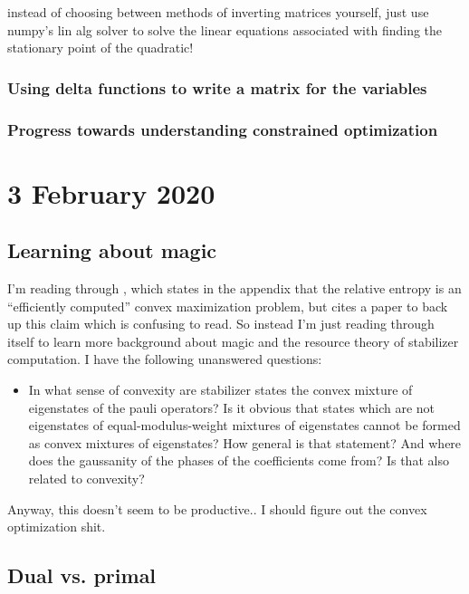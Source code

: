 \documentclass{report}
\begin{document}
instead of choosing between methods of inverting matrices yourself, just use numpy's lin alg solver to solve the linear equations associated with finding the stationary point of the quadratic!

\subsection{Using delta functions to write a matrix for the variables}

\subsection{Progress towards understanding constrained optimization}

\chapter{3 February 2020}

\section{Learning about magic}

I'm reading through \cite{wang2018efficiently}, which states in the appendix that the relative entropy is an ``efficiently computed'' convex maximization problem, but cites a paper to back up this claim which is confusing to read. So instead I'm just reading through \cite{wang2018efficiently} itself to learn more background about magic and the resource theory of stabilizer computation. I have the following unanswered questions:
\begin{itemize}
\item In what sense of convexity are stabilizer states the convex mixture of eigenstates of the pauli operators? Is it obvious that states which are not eigenstates of equal-modulus-weight mixtures of eigenstates cannot be formed as convex mixtures of eigenstates? How general is that statement? And where does the gaussanity of the phases of the coefficients come from? Is that also related to convexity?
\end{itemize}

Anyway, this doesn't seem to be productive.. I should figure out the convex optimization shit.

\section{Dual vs. primal}
\end{document}
